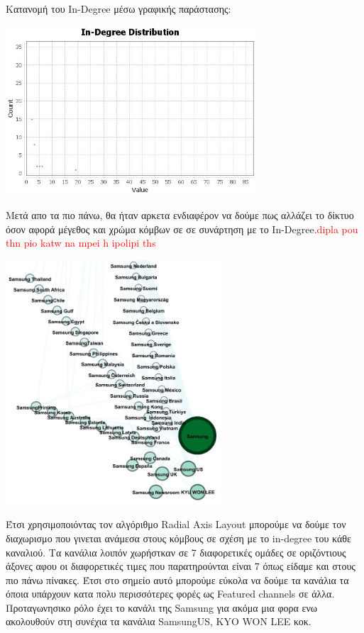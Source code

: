 \documentclass[12pt]{article}
\begin{document}
	\newpage
	Κατανομή του In-Degree μέσω γραφικής παράστασης:
	\begin{center}
		\includegraphics[width=0.7\textwidth]{photos-files/section6/in-degree_graphical.JPG}
	\end{center}
	Μετά απο τα πιο πάνω, θα ήταν αρκετα ενδιαφέρον να δούμε πως αλλάζει το δίκτυο όσον αφορά μέγεθος και χρώμα κόμβων σε σε συνάρτηση με το In-Degree.\textcolor{red}{dipla pou thn pio katw na mpei h ipolipi ths}
	\begin{center}
		\includegraphics[width=0.6\textwidth]{photos-files/section6/in-degree_RE-layout.JPG}
	\end{center}
	Έτσι χρησιμοποιόντας τον αλγόριθμο Radial Axis Layout μπορούμε να δούμε τον διαχωρισμο που γινεται ανάμεσα στους κόμβους σε σχέση με το in-degree του κάθε καναλιού. Τα κανάλια λοιπόν χωρήστκαν σε 7 διαφορετικές ομάδες σε οριζόντιους άξονες αφου οι διαφορετικές τιμες που παρατηρούνται είναι 7 όπως είδαμε και στους πιο πάνω πίνακες. Έτσι στο σημείο αυτό μπορούμε εύκολα να δούμε τα κανάλια τα όποια υπάρχουν κατα πολυ περισσότερες φορές ως Featured channels σε άλλα. Προταγωνησικο ρόλο έχει το κανάλι της Samsung για ακόμα μια φορα ενω ακολουθούν στη συνέχια τα κανάλια SamsungUS,  KYO WON LEE κοκ.
	
\end{document}

